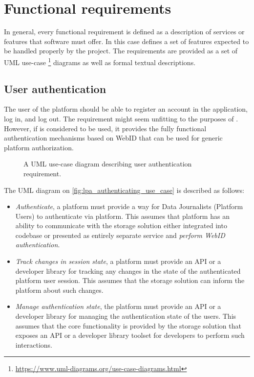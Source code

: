 \section{Functional requirements}
\label{ssec:functional_requirements}

In general, every functional requirement is defined as a description of services or features that software must offer. In this case \lpa{} defines a set of features expected to be handled properly by the \lpas{} project. The requirements are provided as a set of UML use-case \footnote{\url{https://www.uml-diagrams.org/use-case-diagrams.html}} diagrams as well as formal textual descriptions. 

\subsection{User authentication}

The user of the platform should be able to register an account in the application, log in, and log out. The requirement might seem unfitting to the purposes of \lpas{}. However, if \solid{} is considered to be used, it provides the fully functional authentication mechanisms based on WebID that can be used for generic platform authorization.

\begin{figure}[h]
\centering
{}
\caption{A UML use-case diagram describing user authentication requirement.}
\label{fig:lpa_authenticating_use_case}
\end{figure}

The UML diagram on \autoref{fig:lpa_authenticating_use_case} is described as follows:
\begin{itemize}
    \item \textit{Authenticate}, a platform must provide a way for Data Journalists (Platform Users) to authenticate via \lpa{} platform. This assumes that \lpa{} platform has an ability to communicate with the storage solution either integrated into \lpa{} codebase or presented as entirely separate service and \textit{perform WebID authentication}.
    \item \textit{Track changes in session state}, a platform must provide an API or a developer library for tracking any changes in the state of the authenticated platform user session. This assumes that the storage solution can inform the \lpa{} platform about such changes.
    \item \textit{Manage authentication state}, the platform must provide an API or a developer library for managing the authentication state of the users. This assumes that the core functionality is provided by the storage solution that exposes an API or a developer library toolset for developers to perform such interactions.
\end{itemize}

